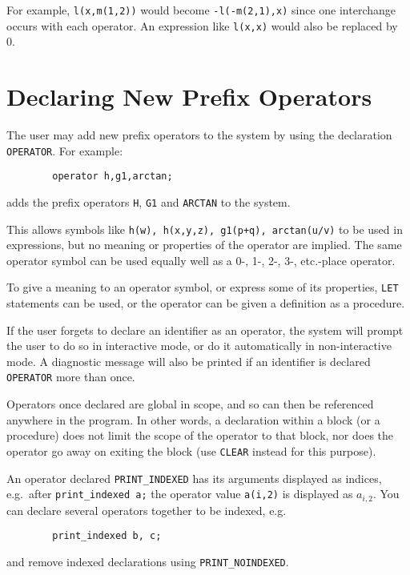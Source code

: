 For example, \texttt{l(x,m(1,2))} would become \texttt{-l(-m(2,1),x)} since one
interchange occurs with each operator.  An expression like \texttt{l(x,x)}
would also be replaced by 0.

\section{Declaring New Prefix Operators}
\hypertarget{command:OPERATOR}{}

The user may add new prefix operators to the system by
using the declaration \texttt{OPERATOR}. For example:
\begin{verbatim}
        operator h,g1,arctan;
\end{verbatim}
adds the prefix operators \texttt{H}, \texttt{G1} and \texttt{ARCTAN} to the system.

This allows symbols like \texttt{h(w), h(x,y,z), g1(p+q), arctan(u/v)} to be
used in expressions, but no meaning or properties of the operator are
implied.  The same operator symbol can be used equally well as a 0-, 1-, 2-,
3-, etc.-place operator.

To give a meaning to an operator symbol, or express some of its
properties, \texttt{LET} statements can be used, or the operator
can be given a definition as a procedure.

If the user forgets to declare an identifier as an operator, the system
will prompt the user to do so in interactive mode, or do it automatically
in non-interactive mode. A diagnostic message will also be printed if an
identifier is declared \texttt{OPERATOR} more than once.

Operators once declared are global in scope, and so can then be referenced
anywhere in the program.  In other words, a declaration within a block (or
a procedure) does not limit the scope of the operator to that block, nor
does the operator go away on exiting the block (use \texttt{CLEAR} instead
for this purpose).

\hypertarget{command:PRINT_INDEXED}{}\hypertarget{command:PRINT_NOINDEXED}{}

An operator declared
\texttt{PRINT\_INDEXED} has
its arguments displayed as indices, e.g.\ after
\texttt{print\_indexed~a;} the operator value \texttt{a(i,2)} is
displayed as \(a_{i,2}\).  You can declare several operators together
to be indexed, e.g.
\begin{verbatim}
        print_indexed b, c;
\end{verbatim}
and remove indexed declarations using
\texttt{PRINT\_NOINDEXED}.


